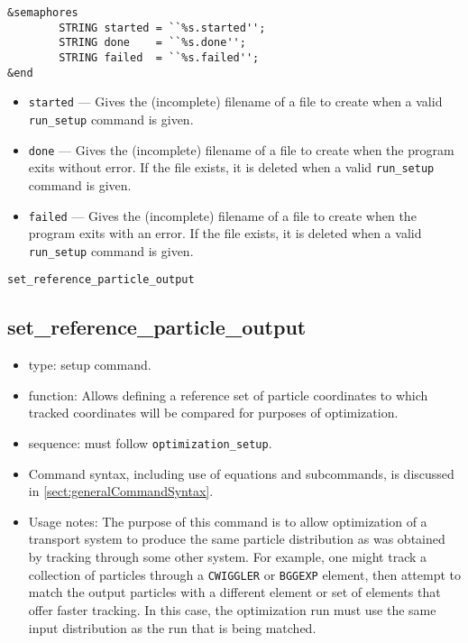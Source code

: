 \documentclass[11pt]{article}
\begin{document}
\begin{verbatim}
&semaphores
        STRING started = ``%s.started'';
        STRING done    = ``%s.done'';
        STRING failed  = ``%s.failed'';
&end
\end{verbatim}

\begin{itemize}
\item {\tt started} --- Gives the (incomplete) filename of a file to create when a valid
        {\tt run\_setup} command is given.
\item {\tt done} --- Gives the (incomplete) filename of a file to create when the program
        exits without error.  If the file exists, it is deleted when a valid {\tt run\_setup}
        command is given.
\item {\tt failed} --- Gives the (incomplete) filename of a file to create when the program
        exits with an error.  If the file exists, it is deleted when a valid {\tt run\_setup}
        command is given.
\end{itemize}

\newpage
\begin{center}{\Large\verb|set_reference_particle_output|}\end{center}
\subsection{set\_reference\_particle\_output \label{subsec:setreferenceparticleoutput}}

\begin{itemize}
\item type: setup command.
\item function: Allows defining a reference set of particle coordinates
  to which tracked coordinates will be compared for purposes of optimization.
\item sequence: must follow \verb|optimization_setup|.
\item Command syntax, including use of equations and subcommands, is discussed in \ref{sect:generalCommandSyntax}.
\item Usage notes: The purpose of this command is to allow optimization of a transport system to produce the same
  particle distribution as was obtained by tracking through some other system. For example, one might track a 
  collection of particles through a \verb|CWIGGLER| or \verb|BGGEXP| element, then attempt to match the output 
  particles with a different element or set of elements that offer faster tracking.
  In this case, the optimization run must use the same input distribution as the run that is being matched.
\end{itemize}
\end{document}
